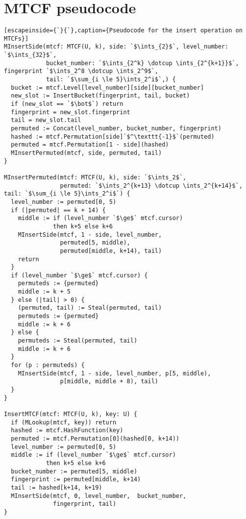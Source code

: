 \documentclass[sigconf, nonacm]{acmart}
\newcommand{\ints}{\mathbb{Z}}
\newcommand{\dotcup}{\ensuremath{\mathaccent\cdot\cup}}
\begin{document}
\section{MTCF pseudocode}
\label{mtcf-appendix}
 


\begin{lstlisting}[escapeinside={`}{`},caption={Pseudocode for the insert operation on MTCFs}]
MInsertSide(mtcf: MTCF(U, k), side: `$\ints_{2}$`, level_number: `$\ints_{32}$`,
            bucket_number: `$\ints_{2^k} \dotcup \ints_{2^{k+1}}$`, fingerprint `$\ints_2^8 \dotcup \ints_2^9$`,
            tail: `$\sum_{i \le 5}\ints_2^i$`,) {
  bucket := mtcf.Level[level_number][side][bucket_number]
  new_slot := InsertBucket(fingerprint, tail, bucket)
  if (new_slot == `$\bot$`) return
  fingerprint = new_slot.fingerprint
  tail = new_slot.tail
  permuted := Concat(level_number, bucket_number, fingerprint)
  hashed := mtcf.Permutation[side]`$^\texttt{-1}$`(permuted)
  permuted = mtcf.Permutation[1 - side](hashed)
  MInsertPermuted(mtcf, side, permuted, tail)
}

MInsertPermuted(mtcf: MTCF(U, k), side: `$\ints_2$`,
                permuted: `$\ints_2^{k+13} \dotcup \ints_2^{k+14}$`, tail: `$\sum_{i \le 5}\ints_2^i$`) {
  level_number := permuted[0, 5)
  if (|permuted| == k + 14) {
    middle := if (level_number `$\ge$` mtcf.cursor)
              then k+5 else k+6
    MInsertSide(mtcf, 1 - side, level_number,
                permuted[5, middle),
                permuted[middle, k+14), tail)
    return
  }
  if (level_number `$\ge$` mtcf.cursor) {
    permuteds := {permuted}
    middle := k + 5
  } else (|tail| > 0) {
    (permuted, tail) := Steal(permuted, tail)
    permuteds := {permuted}
    middle := k + 6
  } else {
    permuteds := Steal(permuted, tail)
    middle := k + 6
  }
  for (p : permuteds) {
    MInsertSide(mtcf, 1 - side, level_number, p[5, middle),
                p[middle, middle + 8), tail)
  }
}

InsertMTCF(mtcf: MTCF(U, k), key: U) {
  if (MLookup(mtcf, key)) return
  hashed := mtcf.HashFunction(key)
  permuted := mtcf.Permutation[0](hashed[0, k+14))
  level_number := permuted[0, 5)
  middle := if (level_number `$\ge$` mtcf.cursor)
            then k+5 else k+6
  bucket_number := permuted[5, middle)
  fingerprint := permuted[middle, k+14)
  tail := hashed[k+14, k+19)
  MInsertSide(mtcf, 0, level_number,  bucket_number,
              fingerprint, tail)
}
\end{lstlisting}
\end{document}
